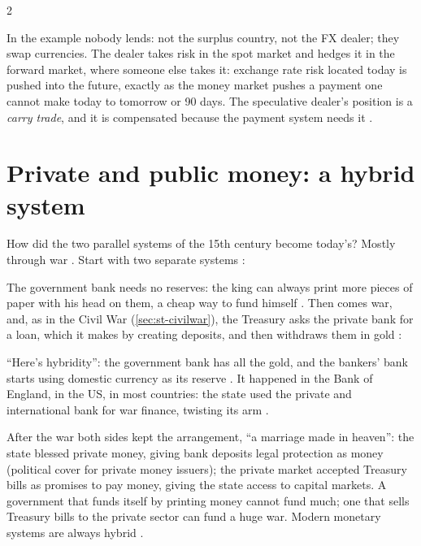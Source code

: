 \begin{paracol}{2}
\begin{intuition}
In the example nobody lends: not the surplus country, not the FX dealer; they swap currencies. The dealer takes risk in the spot market and hedges it in the forward market, where
someone else takes it: exchange rate risk located today is pushed into the future, exactly as the money market pushes a payment one cannot make today to tomorrow or 90 days. The
speculative dealer's position is a \emph{carry trade}, and it is compensated because the payment system needs it .
\end{intuition}

\section{Private and public money: a hybrid system}\label{sec:cm-hybrid}

How did the two parallel systems of the 15th century become today's? Mostly through war . Start with two separate systems
:
\begin{taccts}
\qquad
{}
\end{taccts}
The government bank needs no reserves: the king can always print more pieces of paper with his head on them, a cheap way to fund himself . Then comes
war, and, as in the Civil War (\cref{sec:st-civilwar}), the Treasury asks the private bank for a loan, which it makes by creating deposits, and then withdraws them in gold
:
\begin{taccts}
\qquad
{}
\end{taccts}
``Here's hybridity'': the government bank has all the gold, and the bankers' bank starts using domestic currency as its reserve . It happened in the
Bank of England, in the US, in most countries: the state used the private and international bank for war finance, twisting its arm .

\begin{proposition}
After the war both sides kept the arrangement, ``a marriage made in heaven'': the state blessed private money, giving bank deposits legal protection as money (political cover for
private money issuers); the private market accepted Treasury bills as promises to pay money, giving the state access to capital markets. A government that funds itself by printing
money cannot fund much; one that sells Treasury bills to the private sector can fund a huge war. Modern monetary systems are always hybrid .
\end{proposition}


\end{paracol}
